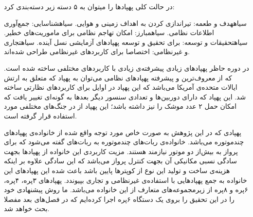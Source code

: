 \noindent در حالت کلی پهپادها را میتوان به ۵ دسته زیر دسته‌بندی کرد:
\begin{enumerate}\setlength\itemsep{0em}
 ‌سیاه{هدف و طعمه:} تیراندازی کردن به اهداف زمینی و هوایی.
 ‌سیاه{شناسایی:} جمع‌آوری اطلاعات نظامی.
 ‌سیاه{مبارز:} امکان تهاجم نظامی برای ماموریت‌های خطیر.
 ‌سیاه{تحقیقات و توسعه:} برای تحقیق و توسعه پهپادهای آزمایشی نسل آینده.
 ‌سیاه{تجاری و غیرنظامی:} اختصاصا برای کاربردهای غیرنظامی طراحی شده‌اند.
\end{enumerate}

در دوره حاظر پهپادهای زیادی پیشرفته‌ی زیادی با کاربردهای مختلفی ساخته شده است. که از معروف‌ترین و پیشرفته پهپادهای نظامی می‌توان به پهپاد  که متعلق به ارتش ایالات متحده‌ی آمریکا می‌باشد که این پهپاد در اوایل  برای کاربردهای نظارتی ساخته شد. این پهپاد که دارای دوربین‌ها و تعدادی سنسور دیگر بعدها به گونه‌ای تغییر یافت که امکان حمل ۲ عدد موشک را نیز داشته باشد؛ این پهپاد از  در جنگ‌های مختلفی مورد استفاده قرار گرفته است.


پهپادی که در این پژوهش به صورت خاص مورد توجه واقع شده از خانواده‌ی پهپاد‌های چندموتوره می‌باشد. خانواده‌ی ربات‌های چندموتوره به ربات‌های گفته می‌شود که برای پرواز به بیش‌از دو موتور نیازمند هستند. مزیت کاربردی این خانواده از پهپادها بجهت سادگی نسبی مکانیکی آن بجهت کنترل پرواز می‌باشد که این سادگی علاوه بر اینکه هزینه‌ی ساخت و تولید این نوع از کوپترها پایین باشد باعث شده این پهپادهای این خانواده به جمع پهپادهایی با استفاده‌ی غیرنظامی و تجاری بپیوندد. پهپادهای ۳پره، ۴پره، ۶پره و ۸پره از زیرمجموعه‌های متعارف از این خانواده می‌باشد. ما روش پیشنهادی خود را در این تحقیق را بروی یک دستگاه ۶پره اجرا کرده‌ایم که در فصل‌های بعد مفصلا بحث خواهد شد.

